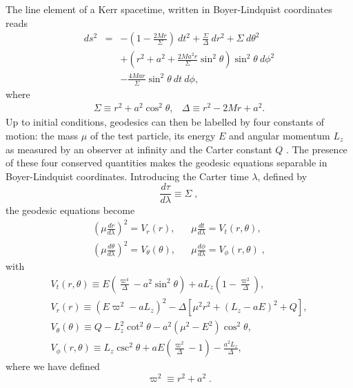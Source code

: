 \documentclass[aps,prd,twocolumn,showpacs,groupedaddress,nofootinbib]{revtex4}
\newcommand{\eq}{\begin{equation}}
\newcommand{\eeq}{\end{equation}}
\begin{document}
The line element of a Kerr spacetime, written in Boyer-Lindquist
coordinates reads~\cite{MTW}
\begin{eqnarray} 
\label{Kerr}
ds^2 &=& 
- \left( 1-\frac{2Mr}{\Sigma} \right) ~dt^2
+ \frac{\Sigma}{\Delta}~dr^2
+ \Sigma~d\theta^2 \nonumber \\
&&+ \left( r^2+a^2 + \frac{2Ma^2r}{\Sigma}\sin^2\theta \right)\sin^2\theta~d\phi^2 \nonumber \\
&&- \frac{4Mar}{\Sigma}\sin^2\theta~dt~d\phi,
\end{eqnarray}
where 
\begin{align}
& \Sigma \equiv r^2 + a^2\cos^2\theta, & \Delta \equiv r^2 - 2Mr + a^2. &
\end{align}
Up to initial conditions, geodesics can then be labelled by four
constants of motion: the mass $\mu$ of the test particle, its energy
$E$ and angular momentum $L_z$ as measured by an observer at infinity
and the Carter constant $Q$ \cite{Carter}. The presence of these four
conserved quantities makes the geodesic equations separable in
Boyer-Lindquist coordinates. Introducing the Carter time $\lambda$,
defined by
\eq
\frac{d\tau}{d\lambda}\equiv\Sigma\;,\eeq 
the geodesic equations become
\begin{align}
&\left(\mu\frac{dr}{d\lambda}\right)^2 = V_r(r), &
&\mu\frac{dt}{d\lambda} = V_t(r,\theta),&
\nonumber \\
&\left(\mu\frac{d\theta}{d\lambda}\right)^2 = V_\theta(\theta), &
&\mu\frac{d\phi}{d\lambda} = V_\phi(r,\theta)\;,&
 \label{geodesics}
\end{align}
with 
\begin{subequations} \label{detailed geodesics}
\begin{align}
&V_t(r,\theta)
  \equiv E \left( \frac{\varpi^4}{\Delta} - a^2\sin^2\theta \right)
     + aL_z \left( 1 - \frac{\varpi^2}{\Delta} \right),&
\label{tdot} \\
&V_r(r)
  \equiv \left( E\varpi^2 - a L_z \right)^2
  - \Delta\left[\mu^2 r^2 + (L_z - a E)^2 + Q\right],&
\label{rdot}\\
&V_\theta(\theta) \equiv Q - L_z^2 \cot^2\theta - a^2(\mu^2 - E^2)\cos^2\theta,&
\label{thetadot}\\
&V_\phi(r,\theta)
  \equiv L_z \csc^2\theta + aE\left(\frac{\varpi^2}{\Delta} - 1\right) - \frac{a^2L_z}{\Delta},&
\label{phidot}
\end{align}
\end{subequations}
where we have defined
\begin{equation}
\varpi^2 \equiv r^2 + a^2\;.
\end{equation}
\end{document}
